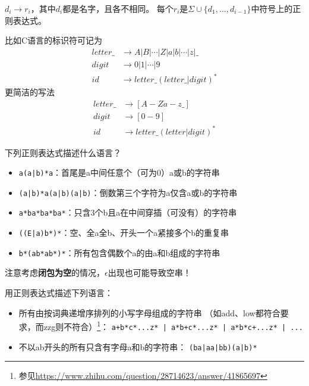 \begin{definition}[正则定义]
$d_i\to r_i$，其中$d_i$都是名字，且各不相同。
每个$r_i$是$\Sigma\cup\{d_1,\ldots,d_{i-1}\}$中符号上的正则表达式。
\end{definition}
\begin{example}
比如C语言的标识符可记为
\[\begin{aligned}
letter\_ &\to A|B|\cdots|Z|a|b|\cdots|z|\_\\
digit &\to 0|1|\cdots|9\\
id &\to letter\_(letter\_|digit)^*
\end{aligned}\]
更简洁的写法
\[\begin{aligned}
letter\_ &\to [A-Za-z\_]\\
digit &\to [0-9]\\
id &\to letter\_(letter|digit)^*
\end{aligned}\]
\end{example}
\begin{example}
下列正则表达式描述什么语言？
\begin{itemize}
	\item \verb'a(a|b)*a'：首尾是a中间任意个（可为0）a或b的字符串
	\item \verb'(a|b)*a(a|b)(a|b)'：倒数第三个字符为a仅含a或b的字符串
	\item \verb'a*ba*ba*ba*'：只含3个b且a在中间穿插（可没有）的字符串
	\item \verb'((E|a)b*)*'：空、全a全b、开头一个a紧接多个b的重复串
	\item \verb'b*(ab*ab*)*'：所有包含偶数个a的由a和b组成的字符串
\end{itemize}
注意考虑\textbf{闭包为空}的情况，$\epsilon$出现也可能导致空串！
\end{example}
\begin{example}
用正则表达式描述下列语言：
\begin{itemize}
	\item 所有由按词典递增序排列的小写字母组成的字符串
	（如add、low都符合要求，而zzg则不符合）\footnote{参见\url{https://www.zhihu.com/question/28714623/answer/41865697}}：
	\verb'a+b*c*...z* | a*b+c*...z* | a*b*c+...z* | ...'
	\item 不以ab开头的所有只含有字母a和b的字符串：
	\verb'(ba|aa|bb)(a|b)*'
\end{itemize}
\end{example}

